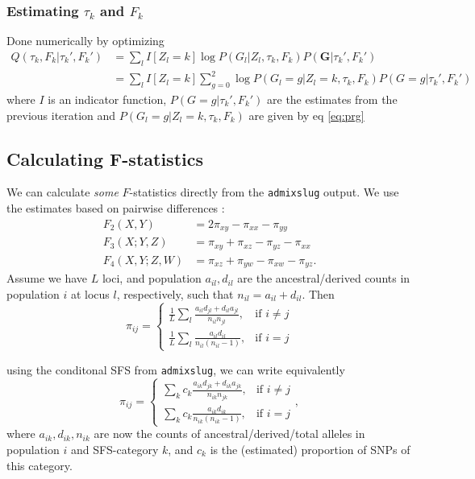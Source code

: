 \documentclass[10pt,a4paper]{article}
\begin{document}
\subsubsection*{Estimating $\tau_k$ and $F_k$}
Done numerically by optimizing
\begin{align*}
Q(\tau_k, F_k | \tau_k', F_k') 
&= \sum_{l} I[Z_l=k] \log P( G_l | Z_l, \tau_k, F_k) P(\mathbf{G} | \tau_k', F_k') \\
&= \sum_{l} I[Z_l=k]\sum_{g=0}^2 \log P( G_l=g | Z_l=k, \tau_k, F_k)P(G=g | \tau_k', F_k')
\end{align*}
where $I$ is an indicator function, $P(G=g | \tau_k', F_k')$ are the estimates from the previous iteration and $ P( G_l=g | Z_l=k, \tau_k, F_k)$ are given by eq \ref{eq:prg}

\subsection*{Calculating F-statistics}
We can calculate \emph{some} $F$-statistics directly from the \texttt{admixslug} output. We use the estimates based on pairwise differences \citep{peter2016}:
\begin{align}
F_2(X, Y) &= 2\pi_{xy} -\pi_{xx} - \pi_{yy}\\
F_3(X; Y, Z) &= \pi_{xy} +\pi_{xz} - \pi_{yz} - \pi_{xx}\\
F_4(X, Y; Z, W) &= \pi_{xz} +\pi_{yw} - \pi_{xw} - \pi_{yz}.
\end{align}
Assume we have $L$ loci, and population $a_{il}, d_{il}$ are the ancestral/derived counts in population $i$ at locus $l$, respectively, such that $n_{il} = a_{il} + d_{il}$. Then
\begin{equation}
\pi_{ij} = \begin{cases}
\frac{1}{L}\sum_l \frac{a_{il}d_{jl} + d_{il}a_{jl}} {n_{il}n_{jl}} ,& \text{if } i \neq j\\
\frac{1}{L}\sum_l \frac{a_{il}d_{il}}{n_{il}(n_{il} -1)},              & \text{if }i =j
\end{cases}
\end{equation}

using the conditonal SFS from \texttt{admixslug}, we can write equivalently
\begin{equation}
\pi_{ij} = \begin{cases}
\sum_k c_k \frac{a_{ik}d_{jk} + d_{ik}a_{jk}} {n_{ik}n_{jk}} ,& \text{if } i \neq j\\
\sum_k c_k \frac{a_{ik}d_{ik}}{n_{ik}(n_{ik} -1)},              & \text{if }i =j
\end{cases},
\end{equation}
where $a_{ik}, d_{ik}, n_{ik}$ are now the counts of ancestral/derived/total alleles in population $i$ and SFS-category $k$, and $c_k$ is the (estimated) proportion of SNPs of this category.
\end{document}
